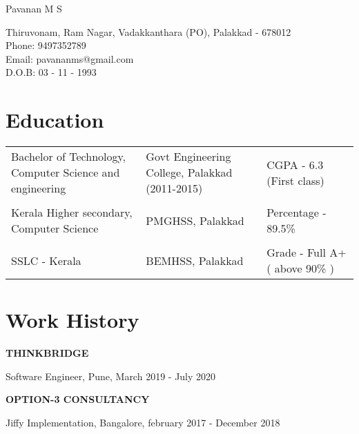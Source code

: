 \documentclass[letterpaper]{article}
\def\name{Pavanan M S}
\renewenvironment{itemize}{
  \begin{list}{}{
    \setlength{\leftmargin}{1.5em}
  }
}{
  \end{list}
}
\begin{document}
{\huge \name}


\vspace{0.25in}

\begin{minipage}{0.75\linewidth}
  Thiruvonam, Ram Nagar, Vadakkanthara (PO), Palakkad - 678012 \\
  Phone: 9497352789 \\
  Email: pavananms@gmail.com\\
  D.O.B: 03 - 11 - 1993 \\

\end{minipage}

\hline
\section*{Education}

\begin{tabular}{p{5cm} p{4cm} l}
  Bachelor of Technology, Computer Science and engineering & Govt Engineering College, Palakkad (2011-2015) &
  CGPA - 6.3 (First class) \\ \\
  Kerala Higher secondary, Computer Science & PMGHSS, Palakkad & Percentage - 89.5\% \\ \\
  SSLC - Kerala & BEMHSS, Palakkad & Grade - Full A+ ( above 90\% )

\end{tabular}

\hline
\section*{Work History}
\begin{itemize}
\item {\bf THINKBRIDGE}
\item Software Engineer, Pune, March 2019 -  July 2020
\end{itemize}
\begin{itemize}
\item {\bf OPTION-3 CONSULTANCY}
\item Jiffy Implementation, Bangalore, february 2017 - December 2018
\end{itemize}
\end{document}
